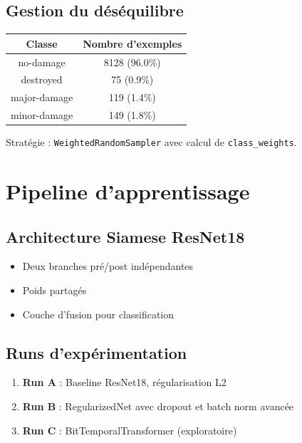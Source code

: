 \documentclass[12pt,a4paper]{article}
\begin{document}
\subsection{Gestion du déséquilibre}
\begin{center}
    \begin{tabular}{|c|c|}
        \hline
        \textbf{Classe} & \textbf{Nombre d'exemples} \\
        \hline
        no-damage & 8128 (96.0\%) \\
        destroyed & 75 (0.9\%) \\
        major-damage & 119 (1.4\%) \\
        minor-damage & 149 (1.8\%) \\
        \hline
    \end{tabular}
\end{center}

Stratégie : \texttt{WeightedRandomSampler} avec calcul de \texttt{class\_weights}.

\newpage

\section{Pipeline d'apprentissage}

\subsection{Architecture Siamese ResNet18}
\begin{itemize}
    \item Deux branches pré/post indépendantes
    \item Poids partagés
    \item Couche d'fusion pour classification
\end{itemize}

\subsection{Runs d'expérimentation}
\begin{enumerate}
    \item \textbf{Run A} : Baseline ResNet18, régularisation L2
    \item \textbf{Run B} : RegularizedNet avec dropout et batch norm avancée
    \item \textbf{Run C} : BitTemporalTransformer (exploratoire)
\end{enumerate}
\end{document}
